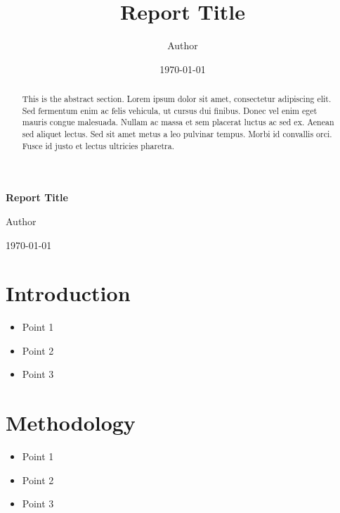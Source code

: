 \documentclass{article}
\title{\textbf{\LARGE Report Title}}
\author{\Large Author}
\date{\Large \today}
\begin{document}
\begin{titlepage}
    \centering
    \vspace*{3cm}
    \vspace*{3cm}
    {\LARGE \textbf{Report Title}}\par
    \vspace{0.5cm}
    {\Large Author}\par
    \vfill
    {\Large \today}\par
\end{titlepage}

\maketitle

\begin{abstract}
This is the abstract section. Lorem ipsum dolor sit amet, consectetur adipiscing elit. Sed fermentum enim ac felis vehicula, ut cursus dui finibus. Donec vel enim eget mauris congue malesuada. Nullam ac massa et sem placerat luctus ac sed ex. Aenean sed aliquet lectus. Sed sit amet metus a leo pulvinar tempus. Morbi id convallis orci. Fusce id justo et lectus ultricies pharetra.
\end{abstract}

\section{Introduction}
\begin{keypoints}
\begin{itemize}
  \item Point 1
  \item Point 2
  \item Point 3
\end{itemize}
\end{keypoints}

\lipsum[1] %

\section{Methodology}
\begin{keypoints}
\begin{itemize}
  \item Point 1
  \item Point 2
  \item Point 3
\end{itemize}
\end{keypoints}
\end{document}
